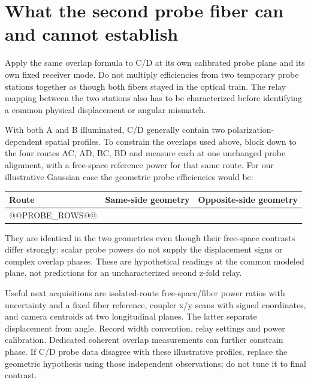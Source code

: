 \documentclass[11pt,a4paper]{article}
\begin{document}
\section{What the second probe fiber can and cannot establish}
Apply the same overlap formula to C/D at its own calibrated probe plane and
its own fixed receiver mode. Do not multiply efficiencies from two temporary
probe stations together as though both fibers stayed in the optical train.
The relay mapping between the two stations also has to be characterized before
identifying a common physical displacement or angular mismatch.

With both A and B illuminated, C/D generally contain two polarization-dependent
spatial profiles. To constrain the overlaps used above, block down to the four
routes AC, AD, BC, BD and measure each at one unchanged probe alignment, with a
free-space reference power for that same route. For our illustrative Gaussian
case the geometric probe efficiencies would be:
\begin{center}\begin{tabular}{lrr}\toprule
Route & Same-side geometry & Opposite-side geometry \\\midrule
@@PROBE_ROWS@@
\bottomrule\end{tabular}\end{center}
They are identical in the two geometries even though their free-space contrasts
differ strongly: scalar probe powers do not supply the displacement signs or
complex overlap phases. These are hypothetical readings at the common modeled
plane, not predictions for an uncharacterized second z-fold relay.

Useful next acquisitions are isolated-route free-space/fiber power ratios with
uncertainty and a fixed fiber reference, coupler x/y scans with signed coordinates,
and camera centroids at two longitudinal planes. The latter separate displacement
from angle. Record width convention, relay settings and power calibration.
Dedicated coherent overlap measurements can further constrain phase. If C/D
probe data disagree with these illustrative profiles, replace the geometric
hypothesis using those independent observations; do not tune it to final contrast.
\end{document}
